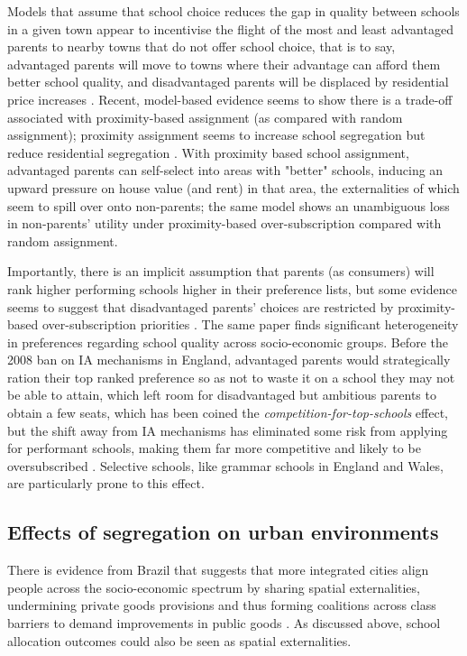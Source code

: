 \documentclass{article}
\begin{document}
\begin{multicols}{2}
Models that assume that school choice reduces the gap in quality between schools in a given town appear to incentivise the flight of the most and least advantaged parents to nearby towns that do not offer school choice, that is to say, advantaged parents will move to towns where their advantage can afford them better school quality, and disadvantaged parents will be displaced by residential price increases \cite{averyDistributionalConsequencesPublic2021}. Recent, model-based evidence seems to show there is a trade-off associated with proximity-based assignment (as compared with random assignment); proximity assignment seems to increase school segregation but reduce residential segregation \cite{greavesSchoolChoiceNeighborhood2024}. With proximity based school assignment, advantaged parents can self-select into areas with "better" schools, inducing an upward pressure on house value (and rent) in that area, the externalities of which seem to spill over onto non-parents; the same model shows an unambiguous loss in non-parents' utility under proximity-based over-subscription compared with random assignment.

Importantly, there is an implicit assumption that parents (as consumers) will rank higher performing schools higher in their preference lists, but some evidence seems to suggest that disadvantaged parents' choices are restricted by proximity-based over-subscription priorities \cite{burgessWhatParentsWant2015}. The same paper finds significant heterogeneity in preferences regarding school quality across socio-economic groups. Before the 2008 ban on IA mechanisms in England, advantaged parents would strategically ration their top ranked preference so as not to waste it on a school they may not be able to attain, which left room for disadvantaged but ambitious parents to obtain a few seats, which has been coined the \textit{competition-for-top-schools} effect, but the shift away from IA mechanisms has eliminated some risk from applying for performant schools, making them far more competitive and likely to be oversubscribed \cite{pathakSchoolAdmissionsReform2013}. Selective schools, like grammar schools in England and Wales, are particularly prone to this effect.

\subsection{Effects of segregation on urban environments}
There is evidence from Brazil that suggests that more integrated cities align people across the socio-economic spectrum by sharing spatial externalities, undermining private goods provisions and thus forming coalitions across class barriers to demand improvements in public goods \cite{xuSegregationSpatialExternalities2024}. As discussed above, school allocation outcomes could also be seen as spatial externalities.


\end{multicols}
\end{document}
